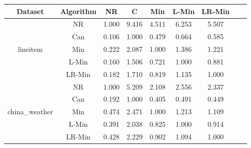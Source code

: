 \documentclass[11pt]{book}
\begin{document}
\begin{table}

	\centering
	
\begin{tabular}{|c|c|c|c|c|c|c|c|c|}

    \hline
    Dataset &
    	Algorithm &
    	NR &
    	C &
    	Min &
    	L-Min &
    	LR-Min \\
    	    
    \hline
    \multirow{5}{*}{lineitem}
         & NR & 1.000 & 9.416 & 4.511 & 6.253 & 5.507 \\                                                                                                                                                             
         & Can & 0.106 & 1.000 & 0.479 & 0.664 & 0.585 \\                                                                                                                                                            
         & Min & 0.222 & 2.087 & 1.000 & 1.386 & 1.221 \\                                                                                                                                                            
         & L-Min & 0.160 & 1.506 & 0.721 & 1.000 & 0.881 \\                                                                                                                                                          
         & LR-Min & 0.182 & 1.710 & 0.819 & 1.135 & 1.000 \\ 	

    \hline
    \multirow{5}{*}{china\_weather}
         & NR & 1.000 & 5.209 & 2.108 & 2.556 & 2.337 \\                                                                                                                                                             
         & Can & 0.192 & 1.000 & 0.405 & 0.491 & 0.449 \\                                                                                                                                                            
         & Min & 0.474 & 2.471 & 1.000 & 1.213 & 1.109 \\                                                                                                                                                            
         & L-Min & 0.391 & 2.038 & 0.825 & 1.000 & 0.914 \\                                                                                                                                                          
         & LR-Min & 0.428 & 2.229 & 0.902 & 1.094 & 1.000 \\
         

\end{tabular}
\end{table}
\end{document}
